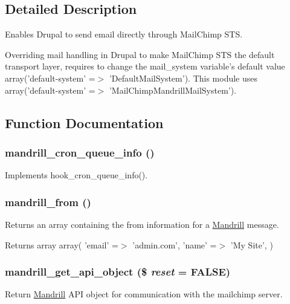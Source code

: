 \subsection{Detailed Description}
Enables Drupal to send email directly through MailChimp STS.

Overriding mail handling in Drupal to make MailChimp STS the default transport layer, requires to change the mail\_\-system variable's default value array('default-\/system' =$>$ 'DefaultMailSystem'). This module uses array('default-\/system' =$>$ 'MailChimpMandrillMailSystem'). 

\subsection{Function Documentation}
\hypertarget{mandrill_8module_aef3727ae488149f312f6951a77bbf7a9}{
\subsubsection[{mandrill\_\-cron\_\-queue\_\-info}]{\setlength{\rightskip}{0pt plus 5cm}mandrill\_\-cron\_\-queue\_\-info ()}}
\label{mandrill_8module_aef3727ae488149f312f6951a77bbf7a9}
Implements hook\_\-cron\_\-queue\_\-info(). \hypertarget{mandrill_8module_afe985bcfaeb96000c36902ece6df9f71}{
\subsubsection[{mandrill\_\-from}]{\setlength{\rightskip}{0pt plus 5cm}mandrill\_\-from ()}}
\label{mandrill_8module_afe985bcfaeb96000c36902ece6df9f71}
Returns an array containing the from information for a \hyperlink{classMandrill}{Mandrill} message.

\begin{DoxyReturn}{Returns}
array array( 'email' =$>$ 'admin.com', 'name' =$>$ 'My Site', ) 
\end{DoxyReturn}
\hypertarget{mandrill_8module_a26f8a56e226e60202c0070adb37aec01}{
\subsubsection[{mandrill\_\-get\_\-api\_\-object}]{\setlength{\rightskip}{0pt plus 5cm}mandrill\_\-get\_\-api\_\-object (\$ {\em reset} = {\ttfamily FALSE})}}
\label{mandrill_8module_a26f8a56e226e60202c0070adb37aec01}
Return \hyperlink{classMandrill}{Mandrill} API object for communication with the mailchimp server.


